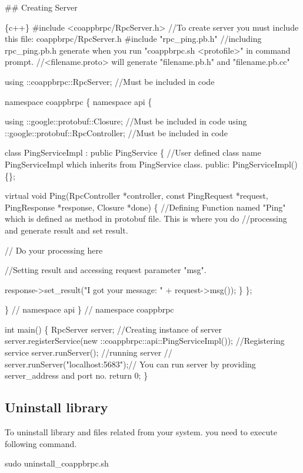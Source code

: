 \#\# Creating Server 
\begin{DoxyCode}
\{c++\}
#include <coappbrpc/RpcServer.h> //To create server you must include this file: coappbrpc/RpcServer.h
#include "rpc\_ping.pb.h" //including rpc\_ping.pb.h generate when you run "coappbrpc.sh <protofile>" in
       command prompt.
                        //<filename.proto> will generate "filename.pb.h" and "filename.pb.cc"

using ::coappbrpc::RpcServer; //Must be included in code

namespace coappbrpc \{
namespace api \{

using ::google::protobuf::Closure; //Must be included in code
using ::google::protobuf::RpcController; //Must be included in code

class PingServiceImpl : public PingService \{ //User defined class name PingServiceImpl which inherits from
       PingService class.
public:
  PingServiceImpl()\{\};

  virtual void Ping(RpcController *controller, const PingRequest *request,
                    PingResponse *response, Closure *done) \{ 
    //Defining Function named "Ping" which is defined as method in protobuf file. This is where you do 
    //processing and generate result and set result. 

    // Do your processing here

    //Setting  result and accessing request parameter "msg".

    response->set\_result("I got your message: " + request->msg()); 
  \}
\};

\} // namespace api
\} // namespace coappbrpc

int main() \{
  RpcServer server; //Creating instance of server
  server.registerService(new ::coappbrpc::api::PingServiceImpl()); //Registering service
  server.runServer(); //running server
  // server.runServer("localhost:5683");// You can run server by providing server\_address and port no.
  return 0;
\}
\end{DoxyCode}


\subsection*{Uninstall library}

To uninstall library and files related from your system. you need to execute following command. 
\begin{DoxyCode}
sudo uninstall\_coappbrpc.sh
\end{DoxyCode}


